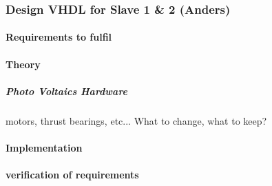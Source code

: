 




\subsubsection{Design VHDL for Slave 1 \& 2 (Anders)}
\paragraph{Requirements to fulfil}


\paragraph{Theory}

\subparagraph{Photo Voltaics Hardware}

motors, thrust bearings, etc...
What to change, what to keep?

\paragraph{Implementation}


\paragraph{verification of requirements}


